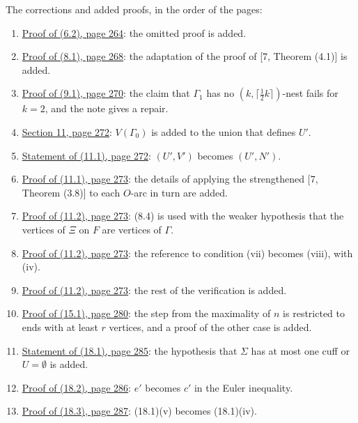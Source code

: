 The corrections and added proofs, in the order of the pages:
\begin{enumerate}\setlength{\itemsep}{1pt}
\item {}\hyperref[fix:6.2-proof-added]{Proof of (6.2), page 264}: the omitted proof is added.
\item {}\hyperref[fix:8.1-proof-added]{Proof of (8.1), page 268}: the adaptation of the proof of [7, Theorem (4.1)] is added.
\item {}\hyperref[fix:9.1-proof]{Proof of (9.1), page 270}: the claim that $\Gamma_1$ has no $(k,\lceil\frac12 k\rceil)$-nest fails for $k=2$, and the note gives a repair.
\item {}\hyperref[fix:11-derived]{Section 11, page 272}: $V(\Gamma_0)$ is added to the union that defines $U'$.
\item {}\hyperref[fix:11.1]{Statement of (11.1), page 272}: $(U',V')$ becomes $(U',N')$.
\item {}\hyperref[fix:11.1-proof-added]{Proof of (11.1), page 273}: the details of applying the strengthened [7, Theorem (3.8)] to each $O$-arc in turn are added.
\item {}\hyperref[fix:11.2-proof-8.4]{Proof of (11.2), page 273}: (8.4) is used with the weaker hypothesis that the vertices of $\Xi$ on $F$ are vertices of $\Gamma$.
\item {}\hyperref[fix:11.2-proof-viii]{Proof of (11.2), page 273}: the reference to condition (vii) becomes (viii), with (iv).
\item {}\hyperref[fix:11.2-proof-added]{Proof of (11.2), page 273}: the rest of the verification is added.
\item {}\hyperref[fix:15.1-proof]{Proof of (15.1), page 280}: the step from the maximality of $n$ is restricted to ends with at least $r$ vertices, and a proof of the other case is added.
\item {}\hyperref[fix:18.1]{Statement of (18.1), page 285}: the hypothesis that $\Sigma$ has at most one cuff or $U=\emptyset$ is added.
\item {}\hyperref[fix:18.2-proof]{Proof of (18.2), page 286}: $e'$ becomes $c'$ in the Euler inequality.
\item {}\hyperref[fix:18.3-proof]{Proof of (18.3), page 287}: (18.1)(v) becomes (18.1)(iv).
\end{enumerate}
